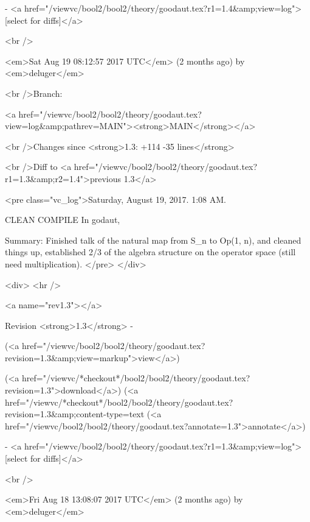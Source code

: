 - <a href="/viewvc/bool2/bool2/theory/goodaut.tex?r1=1.4&amp;view=log">[select for diffs]</a>




<br />

<em>Sat Aug 19 08:12:57 2017 UTC</em>
(2 months ago)
by <em>deluger</em>


<br />Branch:

<a href="/viewvc/bool2/bool2/theory/goodaut.tex?view=log&amp;pathrev=MAIN"><strong>MAIN</strong></a>







<br />Changes since <strong>1.3: +114 -35 lines</strong>








<br />Diff to <a href="/viewvc/bool2/bool2/theory/goodaut.tex?r1=1.3&amp;r2=1.4">previous 1.3</a>










<pre class="vc_log">Saturday, August 19, 2017.  1:08 AM.

CLEAN COMPILE
In godaut,

Summary: Finished talk of the natural map from S_n to Op(1, n), and cleaned
things up, established 2/3 of the algebra structure on the operator
space (still need multiplication).
</pre>
</div>



<div>
<hr />

<a name="rev1.3"></a>


Revision <strong>1.3</strong> -


(<a href="/viewvc/bool2/bool2/theory/goodaut.tex?revision=1.3&amp;view=markup">view</a>)


(<a href="/viewvc/*checkout*/bool2/bool2/theory/goodaut.tex?revision=1.3">download</a>)
(<a href="/viewvc/*checkout*/bool2/bool2/theory/goodaut.tex?revision=1.3&amp;content-type=text%
(<a href="/viewvc/bool2/bool2/theory/goodaut.tex?annotate=1.3">annotate</a>)



- <a href="/viewvc/bool2/bool2/theory/goodaut.tex?r1=1.3&amp;view=log">[select for diffs]</a>




<br />

<em>Fri Aug 18 13:08:07 2017 UTC</em>
(2 months ago)
by <em>deluger</em>


